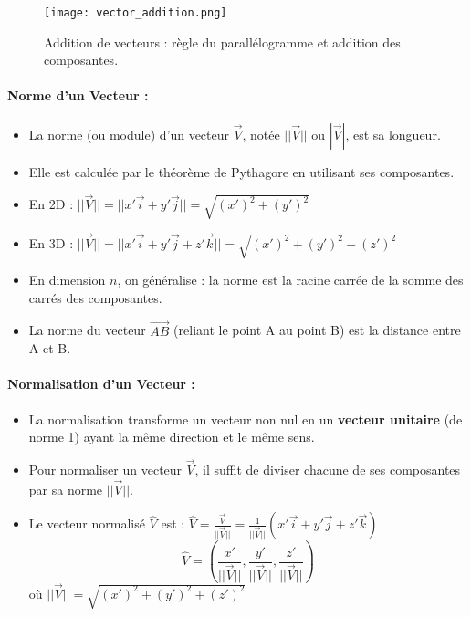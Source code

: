 \documentclass{article}
\begin{document}
\begin{figure}[H]
\centering
\texttt{[image: vector\_addition.png]}
\caption{Addition de vecteurs : règle du parallélogramme et addition des composantes.}
\label{fig:vector_addition}
\end{figure}

\paragraph{Norme d'un Vecteur :}
\begin{itemize}
    \item La norme (ou module) d'un vecteur $\vec{V}$, notée $||\vec{V}||$ ou $|\vec{V}|$, est sa longueur.
    \item Elle est calculée par le théorème de Pythagore en utilisant ses composantes.
    \item En 2D : $||\vec{V}|| = ||x'\vec{i} + y'\vec{j}|| = \sqrt{(x')^2 + (y')^2}$
    \item En 3D : $||\vec{V}|| = ||x'\vec{i} + y'\vec{j} + z'\vec{k}|| = \sqrt{(x')^2 + (y')^2 + (z')^2}$
    \item En dimension $n$, on généralise : la norme est la racine carrée de la somme des carrés des composantes.
    \item La norme du vecteur $\vec{AB}$ (reliant le point A au point B) est la distance entre A et B.
\end{itemize}

\paragraph{Normalisation d'un Vecteur :}
\begin{itemize}
    \item La normalisation transforme un vecteur non nul en un \textbf{vecteur unitaire} (de norme 1) ayant la même direction et le même sens.
    \item Pour normaliser un vecteur $\vec{V}$, il suffit de diviser chacune de ses composantes par sa norme $||\vec{V}||$.
    \item Le vecteur normalisé $\hat{V}$ est : $\hat{V} = \frac{\vec{V}}{||\vec{V}||} = \frac{1}{||\vec{V}||} (x'\vec{i} + y'\vec{j} + z'\vec{k})$
    \[ \hat{V} = \left( \frac{x'}{||\vec{V}||}, \frac{y'}{||\vec{V}||}, \frac{z'}{||\vec{V}||} \right) \]
    où $||\vec{V}|| = \sqrt{(x')^2 + (y')^2 + (z')^2}$
\end{itemize}
\end{document}

